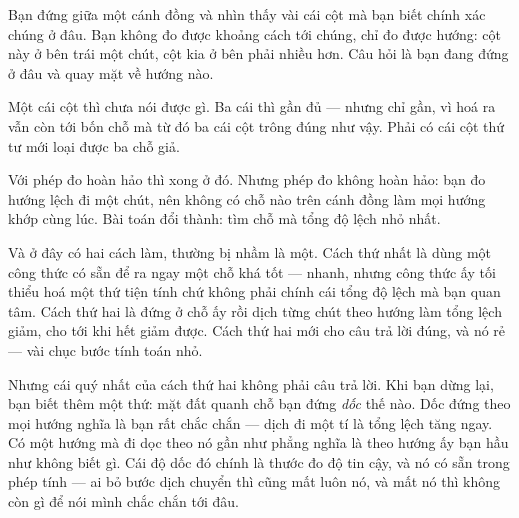 \documentclass[../../marker.tex]{subfiles}
\begin{document}
\begin{traloi}
\end{traloi}

\begin{dongian}
Bạn đứng giữa một cánh đồng và nhìn thấy vài cái cột mà bạn biết chính xác chúng ở đâu. Bạn không đo được khoảng cách tới chúng, chỉ đo được hướng: cột này ở bên trái một chút, cột kia ở bên phải nhiều hơn. Câu hỏi là bạn đang đứng ở đâu và quay mặt về hướng nào.

Một cái cột thì chưa nói được gì. Ba cái thì gần đủ --- nhưng chỉ gần, vì hoá ra vẫn còn tới bốn chỗ mà từ đó ba cái cột trông đúng như vậy. Phải có cái cột thứ tư mới loại được ba chỗ giả.

Với phép đo hoàn hảo thì xong ở đó. Nhưng phép đo không hoàn hảo: bạn đo hướng lệch đi một chút, nên không có chỗ nào trên cánh đồng làm mọi hướng khớp cùng lúc. Bài toán đổi thành: tìm chỗ mà tổng độ lệch nhỏ nhất.

Và ở đây có hai cách làm, thường bị nhầm là một. Cách thứ nhất là dùng một công thức có sẵn để ra ngay một chỗ khá tốt --- nhanh, nhưng công thức ấy tối thiểu hoá một thứ tiện tính chứ không phải chính cái tổng độ lệch mà bạn quan tâm. Cách thứ hai là đứng ở chỗ ấy rồi dịch từng chút theo hướng làm tổng lệch giảm, cho tới khi hết giảm được. Cách thứ hai mới cho câu trả lời đúng, và nó rẻ --- vài chục bước tính toán nhỏ.

Nhưng cái quý nhất của cách thứ hai không phải câu trả lời. Khi bạn dừng lại, bạn biết thêm một thứ: mặt đất quanh chỗ bạn đứng \emph{dốc} thế nào. Dốc đứng theo mọi hướng nghĩa là bạn rất chắc chắn --- dịch đi một tí là tổng lệch tăng ngay. Có một hướng mà đi dọc theo nó gần như phẳng nghĩa là theo hướng ấy bạn hầu như không biết gì. Cái độ dốc đó chính là thước đo độ tin cậy, và nó có sẵn trong phép tính --- ai bỏ bước dịch chuyển thì cũng mất luôn nó, và mất nó thì không còn gì để nói mình chắc chắn tới đâu.


\end{dongian}
\end{document}
